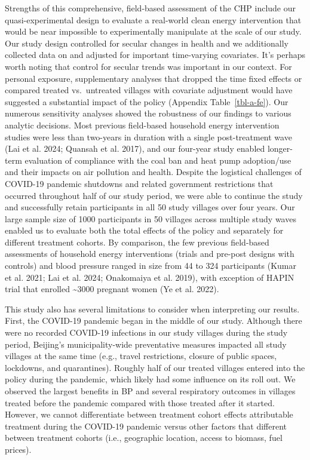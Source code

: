 \documentclass[
  letterpaper,
  DIV=11,
  numbers=noendperiod]{scrartcl}
\begin{document}
Strengths of this comprehensive, field-based assessment of the CHP
include our quasi-experimental design to evaluate a real-world clean
energy intervention that would be near impossible to experimentally
manipulate at the scale of our study. Our study design controlled for
secular changes in health and we additionally collected data on and
adjusted for important time-varying covariates. It's perhaps worth
noting that control for secular trends was important in our context. For
personal exposure, supplementary analyses that dropped the time fixed
effects or compared treated vs.~untreated villages with covariate
adjustment would have suggested a substantial impact of the policy
(Appendix Table~\ref{tbl-a-fe}). Our numerous sensitivity analyses
showed the robustness of our findings to various analytic decisions.
Most previous field-based household energy intervention studies were
less than two-years in duration with a single post-treatment wave (Lai
et al. 2024; Quansah et al. 2017), and our four-year study enabled
longer-term evaluation of compliance with the coal ban and heat pump
adoption/use and their impacts on air pollution and health. Despite the
logistical challenges of COVID-19 pandemic shutdowns and related
government restrictions that occurred throughout half of our study
period, we were able to continue the study and successfully retain
participants in all 50 study villages over four years. Our large sample
size of 1000 participants in 50 villages across multiple study waves
enabled us to evaluate both the total effects of the policy and
separately for different treatment cohorts. By comparison, the few
previous field-based assessments of household energy interventions
(trials and pre-post designs with controls) and blood pressure ranged in
size from 44 to 324 participants (Kumar et al. 2021; Lai et al. 2024;
Onakomaiya et al. 2019), with exception of HAPIN trial that enrolled
\textasciitilde3000 pregnant women (Ye et al. 2022).

This study also has several limitations to consider when interpreting
our results. First, the COVID-19 pandemic began in the middle of our
study. Although there were no recorded COVID-19 infections
in our study villages during the study period, Beijing's
municipality-wide preventative measures impacted all study villages at
the same time (e.g., travel restrictions, closure of public spaces,
lockdowns, and quarantines). Roughly half of our treated villages
entered into the policy during the pandemic, which likely had some
influence on its roll out. We observed the largest benefits in BP and
several respiratory outcomes in villages treated before the pandemic
compared with those treated after it started. However, we cannot
differentiate between treatment cohort effects attributable treatment
during the COVID-19 pandemic versus other factors that different between
treatment cohorts (i.e., geographic location, access to biomass, fuel
prices).
\end{document}
